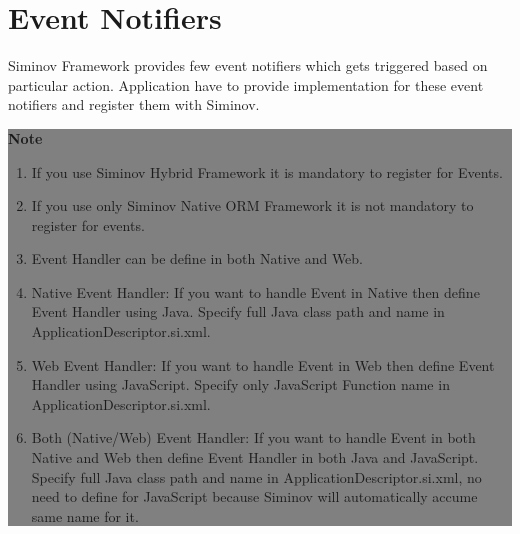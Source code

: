 \newpage
\chapter {\Large{Event Notifiers}}

Siminov Framework provides few event notifiers which gets triggered based on particular action. Application have to provide implementation for these event notifiers and register them with Siminov.

	\begin{center}
		\colorbox{grey}{
			\parbox[t]{.8\linewidth}{
			\fontsize{11pt}{11pt}\selectfont %
			\vspace*{0.1cm} %
		
			\hfill \textbf{Note} \\
				
				\begin{enumerate}

					\item \small If you use Siminov Hybrid Framework it is mandatory to register for Events.

					\item \small If you use only Siminov Native ORM Framework it is not mandatory to register for events.

					\item \small Event Handler can be define in both Native and Web.

					\item \small Native Event Handler: If you want to handle Event in Native then define Event Handler using Java. Specify full Java class path and name in ApplicationDescriptor.si.xml.

					\item \small Web Event Handler: If you want to handle Event in Web then define Event Handler using JavaScript. Specify only JavaScript Function name in ApplicationDescriptor.si.xml.

					\item \small Both (Native/Web) Event Handler: If you want to handle Event in both Native and Web then define Event Handler in both Java and JavaScript. Specify full Java class path and name in ApplicationDescriptor.si.xml, no need to define for JavaScript because Siminov will automatically accume same name for it.
	
				\end{enumerate}
				
			\vspace*{0.0cm} %
			}
		}

	\end{center}





